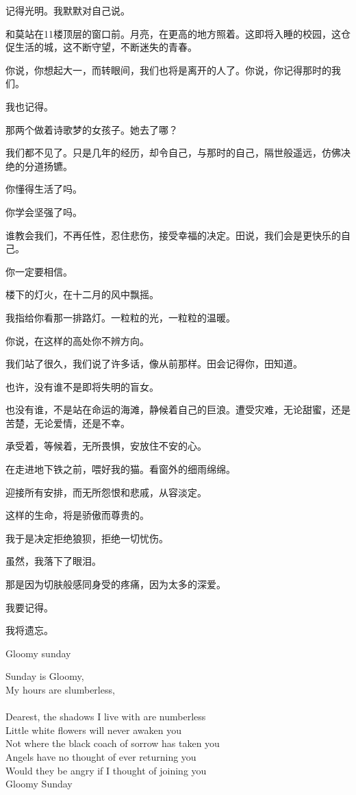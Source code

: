 \documentclass[12pt,a4paper]{article}
\begin{document}
		记得光明。我默默对自己说。

		和莫站在11楼顶层的窗口前。月亮，在更高的地方照着。这即将入睡的校园，这仓促生活的城，这不断守望，不断迷失的青春。\par
		你说，你想起大一，而转眼间，我们也将是离开的人了。你说，你记得那时的我们。\par
		我也记得。\par
		那两个做着诗歌梦的女孩子。她去了哪？\par
		我们都不见了。只是几年的经历，却令自己，与那时的自己，隔世般遥远，仿佛决绝的分道扬镳。\par
		你懂得生活了吗。\par
		你学会坚强了吗。\par
		谁教会我们，不再任性，忍住悲伤，接受幸福的决定。田说，我们会是更快乐的自己。\par
		你一定要相信。

		楼下的灯火，在十二月的风中飘摇。\par
		我指给你看那一排路灯。一粒粒的光，一粒粒的温暖。\par
		你说，在这样的高处你不辨方向。\par
		我们站了很久，我们说了许多话，像从前那样。田会记得你，田知道。

		也许，没有谁不是即将失明的盲女。\par
		也没有谁，不是站在命运的海滩，静候着自己的巨浪。遭受灾难，无论甜蜜，还是苦楚，无论爱情，还是不幸。\par
		承受着，等候着，无所畏惧，安放住不安的心。\par
		在走进地下铁之前，喂好我的猫。看窗外的细雨绵绵。\par
		迎接所有安排，而无所怨恨和悲戚，从容淡定。

		这样的生命，将是骄傲而尊贵的。

		我于是决定拒绝狼狈，拒绝一切忧伤。\par
		虽然，我落下了眼泪。

		那是因为切肤般感同身受的疼痛，因为太多的深爱。

		我要记得。

		我将遗忘。

	\endwriting



		\longpoem{}{}{}

		Gloomy sunday

		Sunday is Gloomy, \\
		My hours are slumberless, \\ \\
		Dearest, the shadows I live with are numberless \\
		Little white flowers will never awaken you \\
		Not where the black coach of sorrow has taken you \\
		Angels have no thought of ever returning you \\
		Would they be angry if I thought of joining you \\
		Gloomy Sunday
\end{document}
